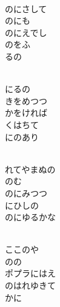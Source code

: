 \documentclass[10pt,b5j]{tarticle} %
\begin{document}
\vspace{1.5em} %
\newcommand{\linespace}{0.5em} %
\newcommand{\blocksize}{0.5\hsize} %
\newcommand{\itemmargin}{6em} %
\begin{enumerate} %
    \setlength{\itemindent}{\itemmargin} %
    \begin{minipage}[c]{\blocksize}
    
        \vspace{\linespace}
        \item~\\
        のにさして\\
        のにも\\
        のにえでし\\
        のをふ\\
        るの
        
        \vspace{\linespace}
        \item~\\
        にるの\\
        きをめつつ\\
        かをければ\\
        くはちて\\
        にのあり
        
        \vspace{\linespace}
        \item~\\
        れてやまぬの\\
        のむ\\
        のにみつつ\\
        にひしの\\
        のにゆるかな
        
        \vspace{\linespace}
        \item~\\
        ここのや\\
        のの\\
        ポプラにはえ\\
        のはれゆきて\\
        かに
    
    \end{minipage}
\end{enumerate} %
\end{document}
